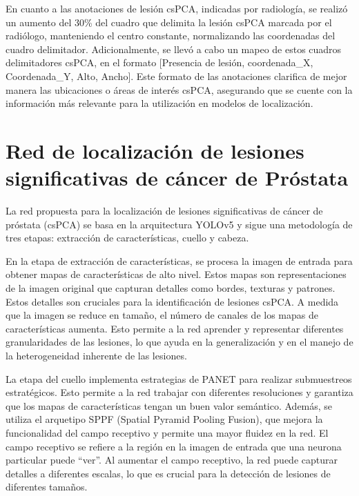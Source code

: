 En cuanto a las anotaciones de lesión csPCA, indicadas por radiología, se realizó un aumento del 30\% del cuadro que delimita la lesión csPCA marcada por el radiólogo, manteniendo el centro constante, normalizando las coordenadas del cuadro delimitador. Adicionalmente, se llevó a cabo un mapeo de estos cuadros delimitadores csPCA, en el formato [Presencia de lesión, coordenada\_X, Coordenada\_Y, Alto,  Ancho]. Este formato de las anotaciones clarifica de mejor manera las ubicaciones o áreas de interés csPCA, asegurando que se cuente con la información más relevante para la utilización en modelos de localización. 


\section{Red de localización de lesiones significativas de cáncer de Próstata}




La red propuesta para la localización de lesiones significativas de cáncer de próstata (csPCA) se basa en la arquitectura YOLOv5 y sigue una metodología de tres etapas: extracción de características, cuello y cabeza.

En la etapa de extracción de características, se procesa la imagen de entrada para obtener mapas de características de alto nivel. Estos mapas son representaciones de la imagen original que capturan detalles como bordes, texturas y patrones. Estos detalles son cruciales para la identificación de lesiones csPCA. A medida que la imagen se reduce en tamaño, el número de canales de los mapas de características aumenta. Esto permite a la red aprender y representar diferentes granularidades de las lesiones, lo que ayuda en la generalización y en el manejo de la heterogeneidad inherente de las lesiones.

La etapa del cuello implementa estrategias de PANET para realizar submuestreos estratégicos. Esto permite a la red trabajar con diferentes resoluciones y garantiza que los mapas de características tengan un buen valor semántico. Además, se utiliza el arquetipo SPPF (Spatial Pyramid Pooling Fusion), que mejora la funcionalidad del campo receptivo y permite una mayor fluidez en la red. El campo receptivo se refiere a la región en la imagen de entrada que una neurona particular puede “ver”. Al aumentar el campo receptivo, la red puede capturar detalles a diferentes escalas, lo que es crucial para la detección de lesiones de diferentes tamaños.

